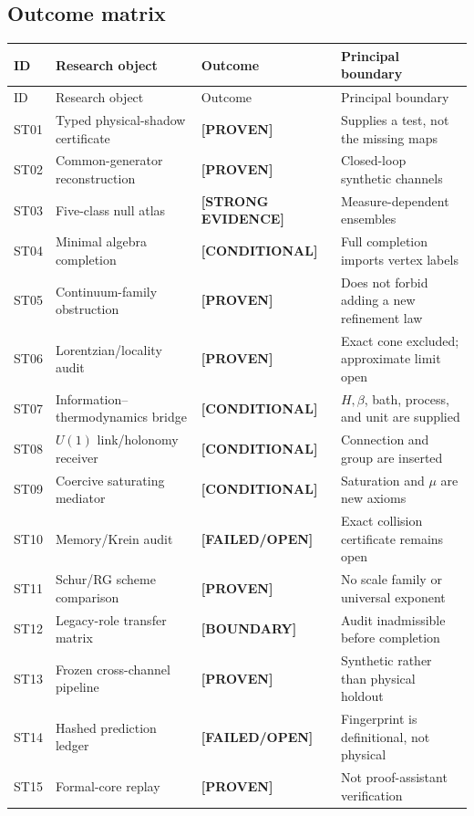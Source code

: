 \documentclass[11pt,a4paper]{article}
\newcommand{\proven}{\textcolor{green!40!black}{\textbf{[PROVEN]}}}
\newcommand{\strong}{\textcolor{blue!70!black}{\textbf{[STRONG EVIDENCE]}}}
\newcommand{\conditional}{\textcolor{black!60}{\textbf{[CONDITIONAL]}}}
\newcommand{\failed}{\textcolor{red!72!black}{\textbf{[FAILED/OPEN]}}}
\newcommand{\boundary}{\textcolor{orange!80!black}{\textbf{[BOUNDARY]}}}
\begin{document}
\subsection{Outcome matrix}

\small
\begin{longtable}{@{}p{}p{}p{}p{}@{}}
\toprule
ID & Research object & Outcome & Principal boundary\\
\midrule
\endfirsthead
\toprule
ID & Research object & Outcome & Principal boundary\\
\midrule
\endhead
ST01 & Typed physical-shadow certificate & \proven{} & Supplies a test, not the missing maps\\
ST02 & Common-generator reconstruction & \proven{} & Closed-loop synthetic channels\\
ST03 & Five-class null atlas & \strong{} & Measure-dependent ensembles\\
ST04 & Minimal algebra completion & \conditional{} & Full completion imports vertex labels\\
ST05 & Continuum-family obstruction & \proven{} & Does not forbid adding a new refinement law\\
ST06 & Lorentzian/locality audit & \proven{} & Exact cone excluded; approximate limit open\\
ST07 & Information--thermodynamics bridge & \conditional{} & $H,\beta$, bath, process, and unit are supplied\\
ST08 & $U(1)$ link/holonomy receiver & \conditional{} & Connection and group are inserted\\
ST09 & Coercive saturating mediator & \conditional{} & Saturation and $\mu$ are new axioms\\
ST10 & Memory/Krein audit & \failed{} & Exact collision certificate remains open\\
ST11 & Schur/RG scheme comparison & \proven{} & No scale family or universal exponent\\
ST12 & Legacy-role transfer matrix & \boundary{} & Audit inadmissible before completion\\
ST13 & Frozen cross-channel pipeline & \proven{} & Synthetic rather than physical holdout\\
ST14 & Hashed prediction ledger & \failed{} & Fingerprint is definitional, not physical\\
ST15 & Formal-core replay & \proven{} & Not proof-assistant verification\\
\bottomrule
\end{longtable}
\normalsize
\end{document}

